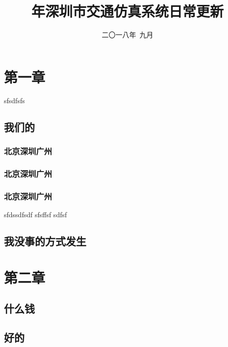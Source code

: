 \documentclass{bookthemeMono}
\title{\cyear 年深圳市交通仿真系统日常更新}
\date{二〇一八年\ 九月}
\begin{document}
\maketitle

\frontmatter

\clearpage
{}
\tableofcontents
\listoffigures
\listoftables

\mainmatter
\chapter{第一章}
sfsdfsfs
\section{我们的}
\subsection{北京深圳广州}
\subsection{北京深圳广州}
\subsection{北京深圳广州}
sfdssdfsdf
sfsffsf
\newpage
sdfsf\\
\clearpage
\section{我没事的方式发生}
\chapter{第二章}
\section{什么钱}
\section{好的}
\end{document}
